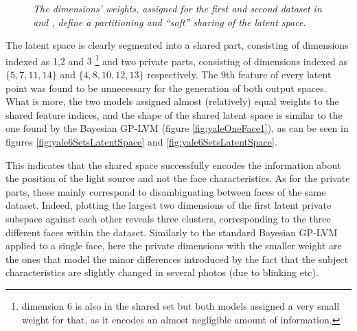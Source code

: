 \begin{figure}[ht]
\begin{center}
\end{center}
\vspace{-9pt}
\caption{\small{ \it
The dimensions' weights, assigned for the first and second dataset 
in  and ,
define a partitioning and ``soft'' sharing of the latent space. 
}}
\label{fig:yale6SetsScales}
\vspace{-8pt}
\end{figure}

The latent space is clearly segmented into a shared part, consisting of dimensions indexed as $1$,$2$ and $3$ 
\footnote{dimension 6 is also in the shared set but both models assigned a very small weight for that, as it encodes an almost negligible amount of information.}
and two private parts, consisting of dimensions indexed as $\{5,7,11,14 \}$ and $\{4,8,10,12,13 \}$ respectively. 
The $9$th feature of every latent point was found to be unnecessary for the generation of both output spaces.
What is more, 
the two models assigned almost (relatively) equal weights to the shared feature indices, and 
the shape of the shared latent space is similar to
the one found by the Bayesian GP-LVM (figure \ref{fig:yaleOneFace1}), as can be seen in figures \ref{fig:yale6SetsLatentSpace} and
\ref{fig:yale6SetsLatentSpace}.

This indicates that the shared space successfully encodes the information about
the position of the light source and not the face characteristics.
 As for the private parts, these mainly correspond to disambiguating between faces of the same dataset. Indeed, plotting the largest two dimensions of
the first latent private subspace against each other reveals three clusters, corresponding to the three different faces within the dataset. 
Similarly to the standard Bayesian GP-LVM applied to a single face, here the private dimensions with the smaller weight
are the ones that model the minor differences introduced by the fact that the subject characteristics are slightly changed in several photos (due to blinking etc).

